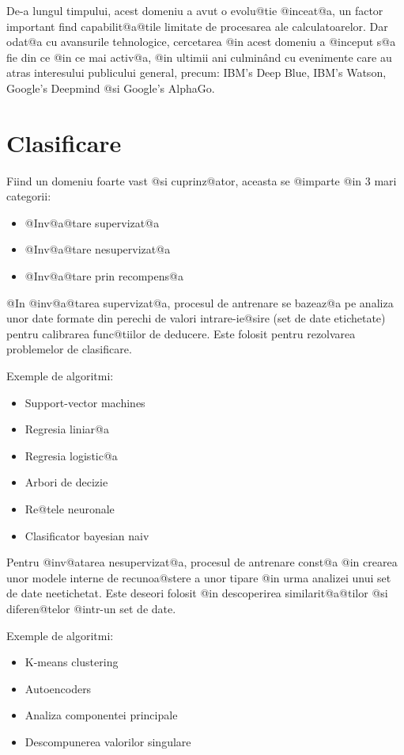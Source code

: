  De-a lungul timpului, acest domeniu a avut o evolu@tie @inceat@a, un factor important find capabilit@a@tile limitate de procesarea ale calculatoarelor. Dar odat@a cu avansurile tehnologice, cercetarea @in acest domeniu a @inceput s@a fie din ce @in ce mai activ@a, @in ultimii ani culmin\^ and cu evenimente care au atras interesului publicului general, precum: IBM's Deep Blue, IBM's Watson, Google's Deepmind @si Google's AlphaGo.
 
 
\newpage

\section{Clasificare}

Fiind un domeniu foarte vast @si cuprinz@ator, aceasta se @imparte @in 3 mari categorii:
\hspace{0.2cm}\begin{itemize}
	\item @Inv@a@tare supervizat@a
	\item @Inv@a@tare nesupervizat@a
	\item @Inv@a@tare prin recompens@a
\end{itemize}

\vspace{0.3cm}
@In @inv@a@tarea supervizat@a, procesul de antrenare se bazeaz@a pe analiza unor date formate din perechi de valori intrare-ie@sire (set de date etichetate) pentru calibrarea func@tiilor de deducere. Este folosit pentru rezolvarea problemelor de clasificare.

Exemple de algoritmi:
\begin{itemize}
	\item Support-vector machines
	\item Regresia liniar@a
	\item Regresia logistic@a
	\item Arbori de decizie
	\item Re@tele neuronale
	\item Clasificator bayesian naiv
\end{itemize}

Pentru @inv@atarea nesupervizat@a, procesul de antrenare const@a @in crearea unor modele interne de recunoa@stere a unor tipare @in urma analizei unui set de date neetichetat. Este deseori folosit @in descoperirea similarit@a@tilor @si diferen@telor @intr-un set de date.

Exemple de algoritmi:
\begin{itemize}
	\item K-means clustering
	\item Autoencoders
	\item Analiza componentei principale
	\item Descompunerea valorilor singulare
\end{itemize}

